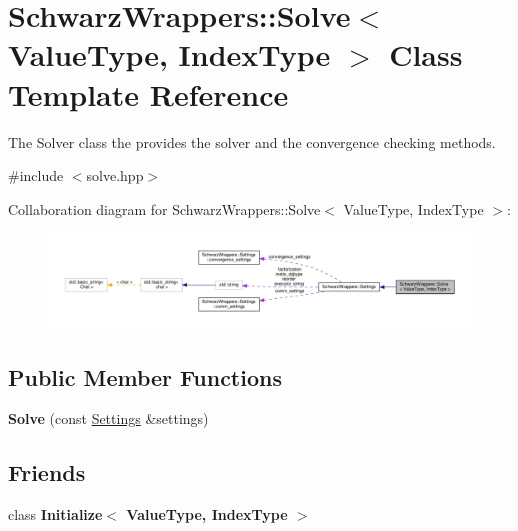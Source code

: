 \hypertarget{classSchwarzWrappers_1_1Solve}{}\section{Schwarz\+Wrappers\+:\+:Solve$<$ Value\+Type, Index\+Type $>$ Class Template Reference}
\label{classSchwarzWrappers_1_1Solve}


The Solver class the provides the solver and the convergence checking methods.  




{\ttfamily \#include $<$solve.\+hpp$>$}



Collaboration diagram for Schwarz\+Wrappers\+:\+:Solve$<$ Value\+Type, Index\+Type $>$\+:
\nopagebreak
\begin{figure}[H]
\begin{center}
\leavevmode
\includegraphics[width=350pt]{classSchwarzWrappers_1_1Solve__coll__graph}
\end{center}
\end{figure}
\subsection*{Public Member Functions}
\begin{DoxyCompactItemize}
\item 
\mbox{\label{classSchwarzWrappers_1_1Solve_adf6ad907c3f2986d528ebde6893bef98}} 
{\bfseries Solve} (const \hyperlink{structSchwarzWrappers_1_1Settings}{Settings} \&settings)
\end{DoxyCompactItemize}
\subsection*{Friends}
\begin{DoxyCompactItemize}
\item 
\mbox{\label{classSchwarzWrappers_1_1Solve_a7044b349fe5363eeace2d1a56b38f650}} 
class {\bfseries Initialize$<$ Value\+Type, Index\+Type $>$}
\end{DoxyCompactItemize}
